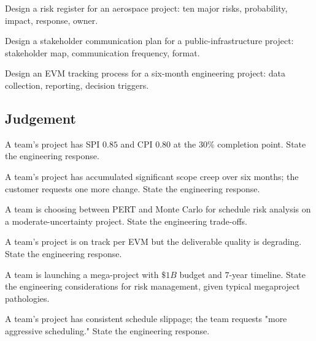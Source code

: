 \begin{exercise}
Design a risk register for an aerospace project: ten major risks, probability, impact, response, owner.
\end{exercise}

\begin{exercise}
Design a stakeholder communication plan for a public-infrastructure project: stakeholder map, communication frequency, format.
\end{exercise}

\begin{exercise}
Design an EVM tracking process for a six-month engineering project: data collection, reporting, decision triggers.
\end{exercise}

\subsection*{Judgement}

\begin{exercise}
A team's project has SPI $0.85$ and CPI $0.80$ at the $30\%$ completion point. State the engineering response.
\end{exercise}

\begin{exercise}
A team's project has accumulated significant scope creep over six months; the customer requests one more change. State the engineering response.
\end{exercise}

\begin{exercise}
A team is choosing between PERT and Monte Carlo for schedule risk analysis on a moderate-uncertainty project. State the engineering trade-offs.
\end{exercise}

\begin{exercise}
A team's project is on track per EVM but the deliverable quality is degrading. State the engineering response.
\end{exercise}

\begin{exercise}
A team is launching a mega-project with $\$1B$ budget and $7$-year timeline. State the engineering considerations for risk management, given typical megaproject pathologies.
\end{exercise}

\begin{exercise}
A team's project has consistent schedule slippage; the team requests "more aggressive scheduling." State the engineering response.
\end{exercise}

